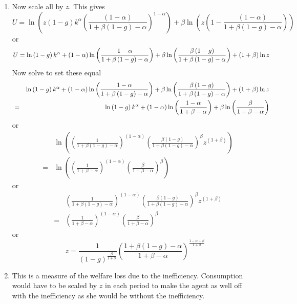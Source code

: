 \documentclass{article}
\begin{document}
\begin{enumerate}
\begin{enumerate}
\item Now scale all by $z$. This gives 
\begin{equation*}
U=\ln \left( z\left( 1-g\right) k^{\alpha }\left( \frac{\left( 1-\alpha
\right) }{1+\beta \left( 1-g\right) -\alpha }\right) ^{1-\alpha }\right)
+\beta \ln \left( z\left( 1-\frac{\left( 1-\alpha \right) }{1+\beta \left(
1-g\right) -\alpha }\right) \right)
\end{equation*}%
or 
\begin{equation*}
U=\ln \left( 1-g\right) k^{\alpha }+\left( 1-\alpha \right) \ln \left( \frac{%
1-\alpha }{1+\beta \left( 1-g\right) -\alpha }\right) +\beta \ln \left( 
\frac{\beta \left( 1-g\right) }{1+\beta \left( 1-g\right) -\alpha }\right)
+\left( 1+\beta \right) \ln z
\end{equation*}%
Now solve to set these equal 
\begin{eqnarray*}
&&\ln \left( 1-g\right) k^{\alpha }+\left( 1-\alpha \right) \ln \left( \frac{%
1-\alpha }{1+\beta \left( 1-g\right) -\alpha }\right) +\beta \ln \left( 
\frac{\beta \left( 1-g\right) }{1+\beta \left( 1-g\right) -\alpha }\right)
+\left( 1+\beta \right) \ln z \\
&=&\ln \left( 1-g\right) k^{\alpha }+\left( 1-\alpha \right) \ln \left( 
\frac{1-\alpha }{1+\beta -\alpha }\right) +\beta \ln \left( \frac{\beta }{%
1+\beta -\alpha }\right)
\end{eqnarray*}%
or%
\begin{eqnarray*}
&&\ln \left( \left( \frac{1}{1+\beta \left( 1-g\right) -\alpha }\right)
^{\left( 1-\alpha \right) }\left( \frac{\beta \left( 1-g\right) }{1+\beta
\left( 1-g\right) -\alpha }\right) ^{\beta }z^{\left( 1+\beta \right)
}\right) \\
&=&\ln \left( \left( \frac{1}{1+\beta -\alpha }\right) ^{\left( 1-\alpha
\right) }\left( \frac{\beta }{1+\beta -\alpha }\right) ^{\beta }\right)
\end{eqnarray*}%
or%
\begin{eqnarray*}
&&\left( \frac{1}{1+\beta \left( 1-g\right) -\alpha }\right) ^{\left(
1-\alpha \right) }\left( \frac{\beta \left( 1-g\right) }{1+\beta \left(
1-g\right) -\alpha }\right) ^{\beta }z^{\left( 1+\beta \right) } \\
&=&\left( \frac{1}{1+\beta -\alpha }\right) ^{\left( 1-\alpha \right)
}\left( \frac{\beta }{1+\beta -\alpha }\right) ^{\beta }
\end{eqnarray*}%
or%
\begin{equation*}
z=\frac{1}{\left( 1-g\right) ^{\frac{\beta }{1+\beta }}}\left( \frac{1+\beta
\left( 1-g\right) -\alpha }{1+\beta -\alpha }\right) ^{\frac{1-\alpha +\beta 
}{1+\beta }}
\end{equation*}

\item This is a measure of the welfare loss due to the inefficiency.
Consumption would have to be scaled by $z$ in each period to make the agent
as well off with the inefficiency as she would be without the inefficiency.
\end{enumerate}
\end{enumerate}
\end{document}
